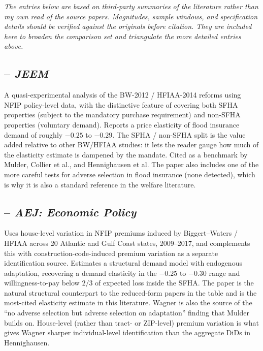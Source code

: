 \documentclass[11pt]{article}
\begin{document}
\textit{The entries below are based on third-party summaries of the literature
rather than my own read of the source papers. Magnitudes, sample windows, and
specification details should be verified against the originals before citation.
They are included here to broaden the comparison set and triangulate the more
detailed entries above.}

\subsection*{\citet{bradt2021} -- \textit{JEEM}}
A quasi-experimental analysis of the BW-2012 / HFIAA-2014 reforms using NFIP
policy-level data, with the distinctive feature of covering both SFHA properties
(subject to the mandatory purchase requirement) and non-SFHA properties
(voluntary demand). Reports a price elasticity of flood insurance demand of
roughly $-0.25$ to $-0.29$. The SFHA / non-SFHA split is the value added relative
to other BW/HFIAA studies: it lets the reader gauge how much of the elasticity
estimate is dampened by the mandate. Cited as a benchmark by Mulder, Collier
et al., and Hennighausen et al. The paper also includes one of the more careful
tests for adverse selection in flood insurance (none detected), which is why
it is also a standard reference in the welfare literature.

\subsection*{\citet{wagner2022} -- \textit{AEJ: Economic Policy}}
Uses house-level variation in NFIP premiums induced by Biggert--Waters / HFIAA
across 20 Atlantic and Gulf Coast states, 2009--2017, and complements this with
construction-code-induced premium variation as a separate identification source.
Estimates a structural demand model with endogenous adaptation, recovering a
demand elasticity in the $-0.25$ to $-0.30$ range and willingness-to-pay below
$2/3$ of expected loss inside the SFHA. The paper is the natural structural
counterpart to the reduced-form papers in the table and is the most-cited
elasticity estimate in this literature. Wagner is also the source of the
``no adverse selection but adverse selection on adaptation'' finding that
Mulder builds on. House-level (rather than tract- or ZIP-level) premium
variation is what gives Wagner sharper individual-level identification than
the aggregate DiDs in Hennighausen.
\end{document}
